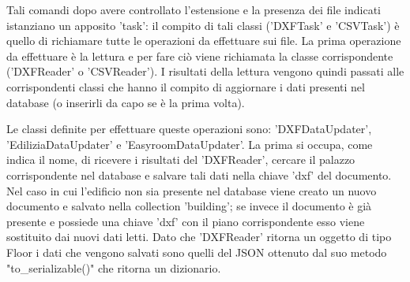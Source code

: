 \documentclass[12pt]{report}
\begin{document}
Tali comandi dopo avere controllato l'estensione e la presenza dei file indicati istanziano un apposito 'task': il compito di tali classi ('DXFTask' e 'CSVTask') è quello di richiamare tutte le operazioni da effettuare sui file.
La prima operazione da effettuare è la lettura e per fare ciò viene richiamata la classe corrispondente ('DXFReader' o 'CSVReader'). 
I risultati della lettura vengono quindi passati alle corrispondenti classi che hanno il compito di aggiornare i dati presenti nel database (o inserirli da capo se è la prima volta). 

Le classi definite per effettuare queste operazioni sono: 'DXFDataUpdater', 'EdiliziaDataUpdater' e 'EasyroomDataUpdater'. 
La prima si occupa, come indica il nome, di ricevere i risultati del 'DXFReader', cercare il palazzo corrispondente nel database e salvare tali dati nella chiave 'dxf' del documento. 
Nel caso in cui l'edificio non sia presente nel database viene creato un nuovo documento e salvato nella collection 'building'; se invece il documento è già presente e possiede una chiave 'dxf' con il piano corrispondente esso viene sostituito dai nuovi dati letti.
Dato che 'DXFReader' ritorna un oggetto di tipo Floor i dati che vengono salvati sono quelli del JSON ottenuto dal suo metodo "to\_serializable()" che ritorna un dizionario. 
\end{document}
